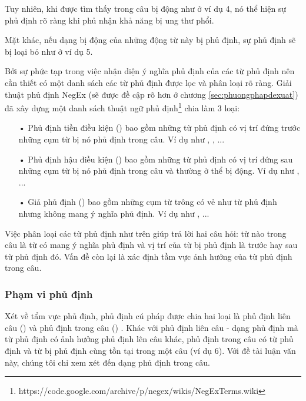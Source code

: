 Tuy nhiên, khi được tìm thấy trong câu bị động như ở ví dụ 4, nó thể hiện sự phủ định rõ ràng khi phủ nhận khả năng bị ung thư phổi. 


Mặt khác, nếu dạng bị động của những động từ này bị phủ định, sự phủ định sẽ bị loại bỏ như ở ví dụ 5.


Bởi sự phức tạp trong việc nhận diện ý nghĩa phủ định của các từ phủ định nên cần thiết có một danh sách các từ phủ định được lọc và phân loại rõ ràng. Giải thuật phủ định NegEx (sẽ được đề cập rõ hơn ở chương \ref{sec:phuongphapdexuat}) đã xây dựng một danh sách thuật ngữ phủ định\footnote{https://code.google.com/archive/p/negex/wikis/NegExTerms.wiki} chia làm 3 loại:

\begin{itemize}
\item[•] Phủ định tiền điều kiện () bao gồm những từ phủ định có vị trí đứng trước những cụm từ bị nó phủ định trong câu. Ví dụ như , , ...
\item[•] Phủ định hậu điều kiện () bao gồm những từ phủ định có vị trí đứng sau những cụm từ bị nó phủ định trong câu và thường ở thể bị động. Ví dụ như , ...
\item[•] Giả phủ định () bao gồm những cụm từ trông có vẻ như từ phủ định nhưng không mang ý nghĩa phủ định. Ví dụ như , ...
\end{itemize}

Việc phân loại các từ phủ định như trên giúp trả lời hai câu hỏi: từ nào trong câu là từ có mang ý nghĩa phủ định và vị trí của từ bị phủ định là trước hay sau từ phủ định đó. Vấn đề còn lại là xác định tầm vực ảnh hưởng của từ phủ định trong câu.

\subsubsection*{Phạm vi phủ định}

Xét về tẩm vực phủ định, phủ định cú pháp được chia hai loại là phủ định liên câu () và phủ định trong câu () \cite{Councill2010}. Khác với phủ định liên câu - dạng phủ định mà từ phủ định có ảnh hưởng phủ định lên câu khác, phủ định trong câu có từ phủ định và từ bị phủ định cùng tồn tại trong một câu (ví dụ 6). Với đề tài luận văn này, chúng tôi chỉ xem xét đến dạng phủ định trong câu.

